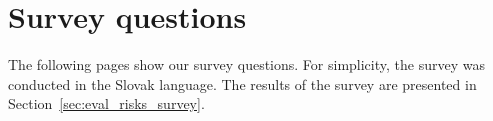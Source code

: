 \setcounter{figure}{0}
\setcounter{table}{0}
\setcounter{section}{0}
\setcounter{listing}{0}

\chapter{Survey questions \label{cha:survey} }
\renewcommand{\thepage}{D-\arabic{page}}


The following pages show our survey questions. For simplicity, the survey was conducted in the Slovak language. The results of the survey are presented in Section~\ref{sec:eval_risks_survey}.

\newpage
\thispagestyle{empty}

% 


\newpage

\thispagestyle{empty}
\mbox{}
\newpage


